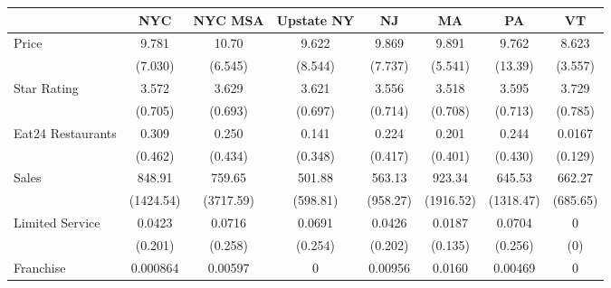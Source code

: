 {
\def\sym#1{\ifmmode^{#1}\else\(^{#1}\)\fi}
\begin{tabular}{l*{7}{c}}
\hline\hline
                    &\multicolumn{1}{c}{NYC}&\multicolumn{1}{c}{NYC MSA}&\multicolumn{1}{c}{Upstate NY}&\multicolumn{1}{c}{NJ}&\multicolumn{1}{c}{MA}&\multicolumn{1}{c}{PA}&\multicolumn{1}{c}{VT}\\
\hline
Price               &       9.781         &       10.70         &       9.622         &       9.869         &       9.891         &       9.762         &       8.623         \\
                    &     (7.030)         &     (6.545)         &     (8.544)         &     (7.737)         &     (5.541)         &     (13.39)         &     (3.557)         \\
[1em]
Star Rating         &       3.572         &       3.629         &       3.621         &       3.556         &       3.518         &       3.595         &       3.729         \\
                    &     (0.705)         &     (0.693)         &     (0.697)         &     (0.714)         &     (0.708)         &     (0.713)         &     (0.785)         \\
[1em]
Eat24 Restaurants   &       0.309         &       0.250         &       0.141         &       0.224         &       0.201         &       0.244         &      0.0167         \\
                    &     (0.462)         &     (0.434)         &     (0.348)         &     (0.417)         &     (0.401)         &     (0.430)         &     (0.129)         \\
[1em]
Sales               &    848.91        &    759.65        &    501.88      &    563.13        &    923.34         &    645.53         &    662.27         \\
                    & (1424.54)         & (3717.59)         &  (598.81)         &  (958.27)         & (1916.52)         & (1318.47)         &  (685.65)         \\
[1em]
Limited Service     &      0.0423         &      0.0716         &      0.0691         &      0.0426         &      0.0187         &      0.0704         &           0         \\
                    &     (0.201)         &     (0.258)         &     (0.254)         &     (0.202)         &     (0.135)         &     (0.256)         &         (0)         \\
[1em]
Franchise               &    0.000864         &     0.00597         &           0         &     0.00956         &      0.0160         &     0.00469         &           0         \\

\end{tabular}}

